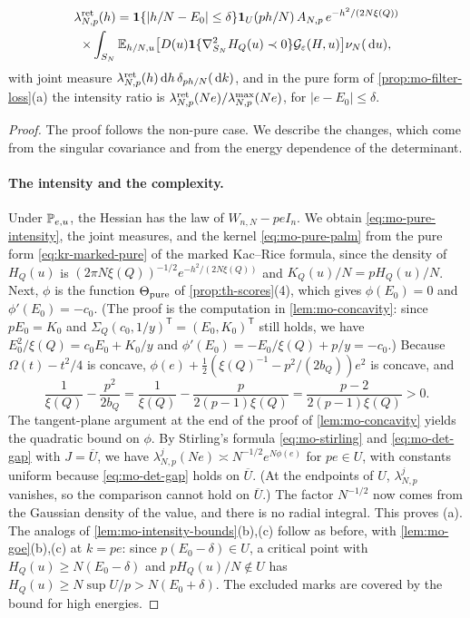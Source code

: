 \begin{proposition}
\begin{enumerate}
\begin{multline}\label{eq:mo-pure-ret}
\lambda_{N,p}^{\rm ret}(h)=\mathbf 1\{|h/N-E_0|\le\delta\}\mathbf 1_U(ph/N)\,A_{N,p}\,e^{-h^2/(2N\xi(Q))}\\
\times\int_{S_N}\mathbb E_{h/N,u}\bigl[D(u)\mathbf 1\{\nabla_{S_N}^2H_Q(u)\prec0\}\mathcal G_\varepsilon(H,u)\bigr]\nu_N(\,\mathrm d u),
\end{multline}
with joint measure $\lambda_{N,p}^{\rm ret}(h)\,\mathrm d h\,\delta_{ph/N}(\,\mathrm d k)$, and in the pure form of \cref{prop:mo-filter-loss}(a) the intensity ratio is $\lambda_{N,p}^{\rm ret}(Ne)/\lambda_{N,p}^{\max}(Ne)$, for $|e-E_0|\le\delta$.
\end{enumerate}
\end{proposition}

\begin{proof}
The proof follows the non-pure case. We describe the changes, which come from the singular covariance and from the energy dependence of the determinant.

\paragraph{The intensity and the complexity.}
Under $\mathbb P_{e,u}$, the Hessian has the law of $W_{n,N}-peI_n$. We obtain \eqref{eq:mo-pure-intensity}, the joint measures, and the kernel \eqref{eq:mo-pure-palm} from the pure form \eqref{eq:kr-marked-pure} of the marked Kac--Rice formula, since the density of $H_Q(u)$ is $(2\pi N\xi(Q))^{-1/2}e^{-h^2/(2N\xi(Q))}$ and $K_Q(u)/N=pH_Q(u)/N$. Next, $\phi$ is the function $\Theta_{\rm pure}$ of \cref{prop:th-scores}(4), which gives $\phi(E_0)=0$ and $\phi'(E_0)=-c_0$. (The proof is the computation in \cref{lem:mo-concavity}: since $pE_0=K_0$ and $\Sigma_Q(c_0,1/y)^{\mathsf T}=(E_0,K_0)^{\mathsf T}$ still holds, we have $E_0^2/\xi(Q)=c_0E_0+K_0/y$ and $\phi'(E_0)=-E_0/\xi(Q)+p/y=-c_0$.) Because $\Omega(t)-t^2/4$ is concave, $\phi(e)+\frac12(\xi(Q)^{-1}-p^2/(2b_Q))e^2$ is concave, and
\[
\frac1{\xi(Q)}-\frac{p^2}{2b_Q}=\frac1{\xi(Q)}-\frac p{2(p-1)\xi(Q)}=\frac{p-2}{2(p-1)\xi(Q)}>0.
\]
The tangent-plane argument at the end of the proof of \cref{lem:mo-concavity} yields the quadratic bound on $\phi$. By Stirling's formula \eqref{eq:mo-stirling} and \eqref{eq:mo-det-gap} with $J=\overline U$, we have $\lambda_{N,p}^j(Ne)\asymp N^{-1/2}e^{N\phi(e)}$ for $pe\in U$, with constants uniform because \eqref{eq:mo-det-gap} holds on $\overline U$. (At the endpoints of $U$, $\lambda_{N,p}^j$ vanishes, so the comparison cannot hold on $\overline U$.) The factor $N^{-1/2}$ now comes from the Gaussian density of the value, and there is no radial integral. This proves (a). The analogs of \cref{lem:mo-intensity-bounds}(b),(c) follow as before, with \cref{lem:mo-goe}(b),(c) at $k=pe$: since $p(E_0-\delta)\in U$, a critical point with $H_Q(u)\ge N(E_0-\delta)$ and $pH_Q(u)/N\notin U$ has $H_Q(u)\ge N\sup U/p>N(E_0+\delta)$. The excluded marks are covered by the bound for high energies.


\end{proof}
